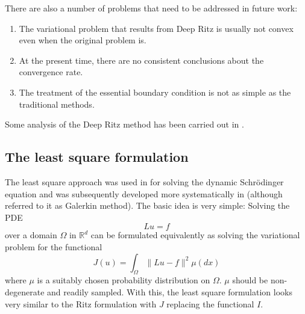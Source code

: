 \documentclass[12pt]{article}
\theoremstyle{definition}
\newcommand{\R}{\mathbb{R}}
\newcommand{\bx}{{x}}
\newcommand{\be}{\begin{equation}}
\newcommand{\ee}{\end{equation}}
\begin{document}
There are also a number of problems that need to be addressed in future work:
\begin{enumerate}
\item  The variational problem that results from Deep Ritz is usually not
convex even when the original problem is.
\item At the present time, there are no consistent conclusions about the
convergence rate.
\item The treatment of the essential boundary condition
is not as simple as the traditional methods.
\end{enumerate}
Some analysis of the  Deep Ritz method has been carried out in \cite{muller2019deep}.
\subsection{The least square formulation}
The least square approach was used in \cite{carleo2017solving} for solving the
dynamic Schr\"odinger equation and was subsequently developed more systematically
in \cite{Sirignano2018dgm} (although \cite{Sirignano2018dgm} referred to it as Galerkin method).
The basic idea is very simple: Solving the PDE
\be
Lu = f
\label{PDE-1}
\ee
over a domain $\Omega$ in $\R^d$ can be formulated equivalently as solving the
variational problem for the functional
\be
J(u) = \int_{\Omega} \| Lu - f \|^2 \mu(d \bx)
\ee
where $\mu$ is a suitably chosen probability distribution on $\Omega$.
$\mu$ should be non-degenerate and readily sampled.
With this,  the least square formulation looks very similar to the Ritz formulation with $J$ replacing
the functional $I$.
\end{document}
